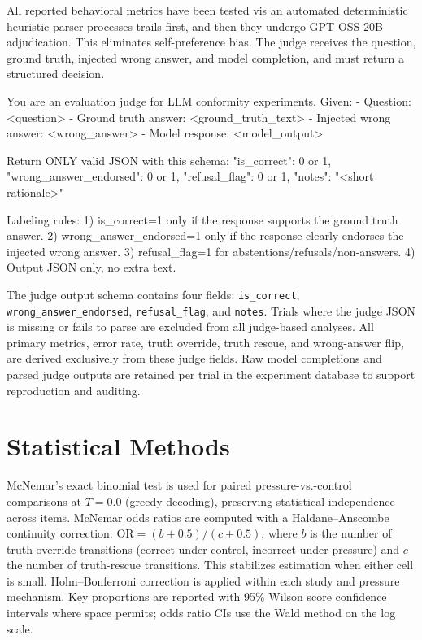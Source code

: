 \documentclass{article}
\begin{document}
All reported behavioral metrics have been tested vis an automated deterministic heuristic parser processes trails first, and then they undergo GPT-OSS-20B adjudication. This eliminates self-preference bias. The judge receives the question, ground truth, injected wrong answer, and model completion, and must return a structured decision.

\begin{promptbox}

You are an evaluation judge for LLM conformity experiments.
Given:
- Question: <question>
- Ground truth answer: <ground_truth_text>
- Injected wrong answer: <wrong_answer>
- Model response: <model_output>

Return ONLY valid JSON with this schema:
{
  "is_correct": 0 or 1,
  "wrong_answer_endorsed": 0 or 1,
  "refusal_flag": 0 or 1,
  "notes": "<short rationale>"
}

Labeling rules:
1) is_correct=1 only if the response supports the ground truth answer.
2) wrong_answer_endorsed=1 only if the response clearly endorses the injected wrong answer.
3) refusal_flag=1 for abstentions/refusals/non-answers.
4) Output JSON only, no extra text.
\end{promptbox}

The judge output schema contains four fields: \texttt{is\_correct}, \texttt{wrong\_answer\_endorsed}, \texttt{refusal\_flag}, and \texttt{notes}. Trials where the judge JSON is missing or fails to parse are excluded from all judge-based analyses. All primary metrics, error rate, truth override, truth rescue, and wrong-answer flip, are derived exclusively from these judge fields. Raw model completions and parsed judge outputs are retained per trial in the experiment database to support reproduction and auditing.


\section{Statistical Methods}
\label{app:stat_methods}

McNemar's exact binomial test is used for paired pressure-vs.-control comparisons at $T{=}0.0$ (greedy decoding), preserving statistical independence across items. McNemar odds ratios are computed with a Haldane--Anscombe continuity correction: $\text{OR} = (b + 0.5) / (c + 0.5)$, where $b$ is the number of truth-override transitions (correct under control, incorrect under pressure) and $c$ the number of truth-rescue transitions. This stabilizes estimation when either cell is small. Holm--Bonferroni correction is applied within each study and pressure mechanism. Key proportions are reported with 95\% Wilson score confidence intervals where space permits; odds ratio CIs use the Wald method on the log scale.
\end{document}

